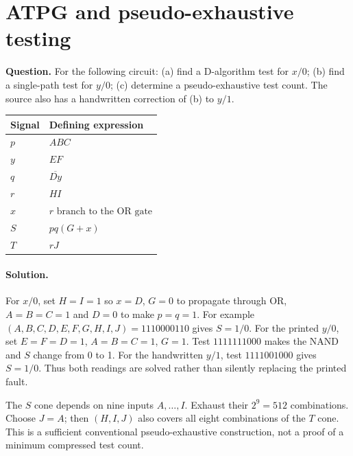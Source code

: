 \documentclass[11pt]{article}
\newcommand{\sol}{\paragraph{Solution.}}
\begin{document}
\section{ATPG and pseudo-exhaustive testing}
\textbf{Question.} For the following circuit:
(a) find a D-algorithm test for $x/0$;
(b) find a single-path test for $y/0$;
(c) determine a pseudo-exhaustive test count.
The source also has a handwritten correction of (b) to $y/1$.
\begin{center}\begin{tabular}{ll}\toprule Signal & Defining expression\\\midrule
$p$ & $ABC$\\
$y$ & $EF$\\
$q$ & $\overline{Dy}$\\
$r$ & $HI$\\
$x$ & $r\text{ branch to the OR gate}$\\
$S$ & $pq(G+x)$\\
$T$ & $rJ$\\
\bottomrule\end{tabular}\end{center}
\begin{center}\end{center}

\sol For $x/0$, set $H=I=1$ so $x=D$, $G=0$ to propagate through OR,
$A=B=C=1$ and $D=0$ to make $p=q=1$.
For example $(A,B,C,D,E,F,G,H,I,J)=1110000110$ gives $S=1/0$.
For the printed $y/0$, set $E=F=D=1$, $A=B=C=1$, $G=1$.
Test $1111111000$ makes the NAND and $S$ change from 0 to 1.
For the handwritten $y/1$, test $1111001000$ gives $S=1/0$.
Thus both readings are solved rather than silently replacing the printed fault.

The $S$ cone depends on nine inputs $A,\ldots,I$. Exhaust their $2^9=512$
combinations. Choose $J=A$; then $(H,I,J)$ also covers all eight combinations
of the $T$ cone. This is a sufficient conventional pseudo-exhaustive
construction, not a proof of a minimum compressed test count.
\end{document}
